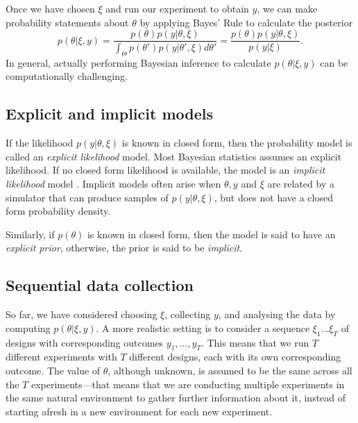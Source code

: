 \documentclass[a4paper, 10pt]{report}
\theoremstyle{plain}
\begin{document}
	Once we have chosen $\xi$ and run our experiment to obtain $y$, we can make probability statements about $\theta$ by applying Bayes' Rule to calculate the posterior 
	\begin{equation}
	\label{eq:bayes}
	p(\theta|\xi,y) = \frac{p(\theta)p(y|\theta,\xi)}{\int_\Theta p(\theta')p(y|\theta',\xi)d\theta'} = \frac{p(\theta)p(y|\theta,\xi)}{p(y|\xi)}.
	\end{equation}
	In general, actually performing Bayesian inference to calculate $p(\theta|\xi,y)$ can be computationally challenging.
	
	
	
	
	\subsection{Explicit and implicit models}
	\label{sec:explicit_implicit}
	If the likelihood $p(y|\theta,\xi)$ is known in closed form, then the probability model is called an \emph{explicit likelihood} model. 
	Most Bayesian statistics assumes an explicit likelihood.
	If no closed form likelihood is available, the model is an \emph{implicit likelihood} model \citep{sisson2018handbook}.
	Implicit models often arise when $\theta,y$ and $\xi$ are related by a simulator \citep{alsing2019fast,brehmer2018constraining,gonccalves2020training} that can produce samples of $p(y|\theta,\xi)$, but does not have a closed form probability density.
	
	Similarly, if $p(\theta)$ is known in closed form, then the model is said to have an \emph{explicit prior}, otherwise, the prior is said to be \emph{implicit}.
	
	
	
	\subsection{Sequential data collection}
	\label{sec:seq_data}
	So far, we have considered choosing $\xi$, collecting $y$, and analysing the data by computing $p(\theta|\xi,y)$.
	A more realistic setting is to consider a sequence $\xi_1\dots\xi_T$ of designs with corresponding outcomes $y_1,\dots,y_T$.
	This means that we run $T$ different experiments with $T$ different designs, each with its own corresponding outcome. The value of $\theta$, although unknown, is assumed to be the same across all the $T$ experiments---that means that we are conducting multiple experiments in the same natural environment to gather further information about it, instead of starting afresh in a new environment for each new experiment.
	
\end{document}
